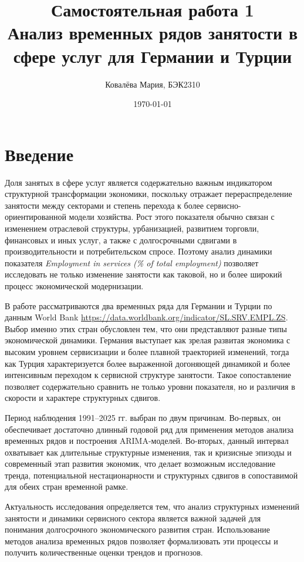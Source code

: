 \documentclass[12pt,a4paper]{article}
\title{Самостоятельная работа 1\\Анализ временных рядов занятости в сфере услуг для Германии и Турции}
\author{Ковалёва Мария, БЭК2310}
\date{\today}
\begin{document}
\maketitle
\thispagestyle{empty}
\clearpage
\tableofcontents
\newpage

\section{Введение}

Доля занятых в сфере услуг является содержательно важным индикатором структурной трансформации экономики, поскольку отражает перераспределение занятости между секторами и степень перехода к более сервисно-ориентированной модели хозяйства. Рост этого показателя обычно связан с изменением отраслевой структуры, урбанизацией, развитием торговли, финансовых и иных услуг, а также с долгосрочными сдвигами в производительности и потребительском спросе. Поэтому анализ динамики показателя \textit{Employment in services (\% of total employment)} позволяет исследовать не только изменение занятости как таковой, но и более широкий процесс экономической модернизации.

В работе рассматриваются два временных ряда для Германии и Турции по данным World Bank \url{https://data.worldbank.org/indicator/SL.SRV.EMPL.ZS}. Выбор именно этих стран обусловлен тем, что они представляют разные типы экономической динамики. Германия выступает как зрелая развитая экономика с высоким уровнем сервисизации и более плавной траекторией изменений, тогда как Турция характеризуется более выраженной догоняющей динамикой и более интенсивным переходом к сервисной структуре занятости. Такое сопоставление позволяет содержательно сравнить не только уровни показателя, но и различия в скорости и характере структурных сдвигов.

Период наблюдения 1991--2025 гг. выбран по двум причинам. Во-первых, он обеспечивает достаточно длинный годовой ряд для применения методов анализа временных рядов и построения ARIMA-моделей. Во-вторых, данный интервал охватывает как длительные структурные изменения, так и кризисные эпизоды и современный этап развития экономик, что делает возможным исследование тренда, потенциальной нестационарности и структурных сдвигов в сопоставимой для обеих стран временной рамке.

Актуальность исследования определяется тем, что анализ структурных изменений занятости и динамики сервисного сектора является важной задачей для понимания долгосрочного экономического развития стран. Использование методов анализа временных рядов позволяет формализовать эти процессы и получить количественные оценки трендов и прогнозов.
\end{document}
